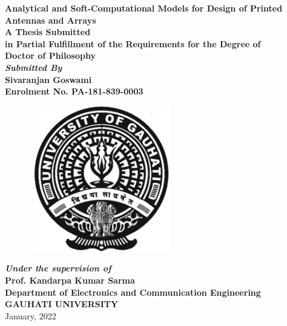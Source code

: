 \begin{titlepage}
\begin{center}
{\Large \bf Analytical and Soft-Computational Models for Design of Printed Antennas and Arrays} \\ [5ex]


{\normalsize{ \textbf{A Thesis Submitted \\in
 Partial Fulfillment of the Requirements for the Degree of \\\large \bf
Doctor of Philosophy}}}\\
[8ex] {\sl \textbf{Submitted By}} \\[2ex]
{\sf \sf \textbf{Sivaranjan Goswami\\
Enrolment No. PA-181-839-0003}}\\[6ex]

\begin{figure}[h]
\centering
\includegraphics[width=2.5in,height=2.5in]{gulogo.eps}\\
\end{figure}

{\sl \textbf{Under the supervision of}} \\[2ex]
{\sf \sf \textbf{Prof. Kandarpa Kumar Sarma}}\\ [6ex]


\vspace{0.5in}
{\large \bf Department of Electronics and Communication Engineering}  \\[1ex]
{\large \bf{GAUHATI UNIVERSITY}} \\[1ex]
{\normalsize January, 2022 }
\end{center}
\end{titlepage}
